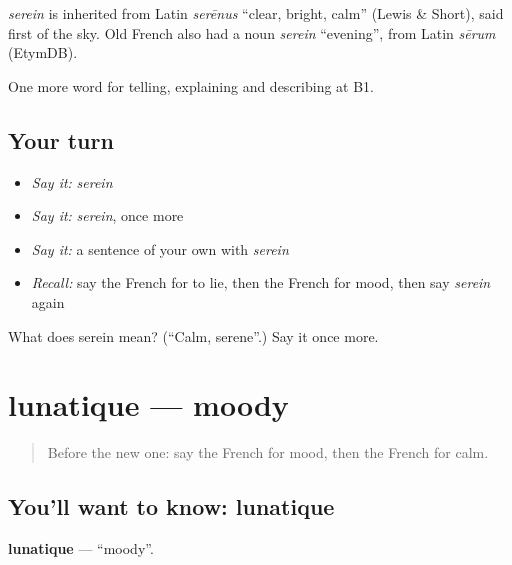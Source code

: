 \begin{cousinweb}
\emph{serein} is inherited from Latin \emph{serēnus} \textquotedblleft{}clear, bright, calm\textquotedblright{} (Lewis \& Short), said first of the sky. Old French also had a noun \emph{serein} \textquotedblleft{}evening\textquotedblright{}, from Latin \emph{sērum} (EtymDB).
\end{cousinweb}

\begin{grammarlens}[title={What you've built}]
One more word for telling, explaining and describing at B1.
\end{grammarlens}

\subsection*{Your turn}
\begin{itemize}
\raggedright
  \item \emph{Say it:} \emph{serein}
  \item \emph{Say it:} \emph{serein}, once more
  \item \emph{Say it:} a sentence of your own with \emph{serein}
  \item \emph{Recall:} say the French for to lie, then the French for mood, then say \emph{serein} again
\end{itemize}

\begin{tcolorbox}[breakable,colback=teal!4,colframe=teal!35!black,title={Before you move on}]
What does serein mean? (\textquotedblleft{}Calm, serene\textquotedblright{}.) Say it once more.
\end{tcolorbox}
\section[lunatique]{lunatique — moody}

\label{lesson:FR-C469-lunatique}



\begin{quote}
Before the new one: say the French for mood, then the French for calm.
\end{quote}

\subsection*{You'll want to know: lunatique}
\textbf{lunatique} — \textquotedblleft{}moody\textquotedblright{}.

